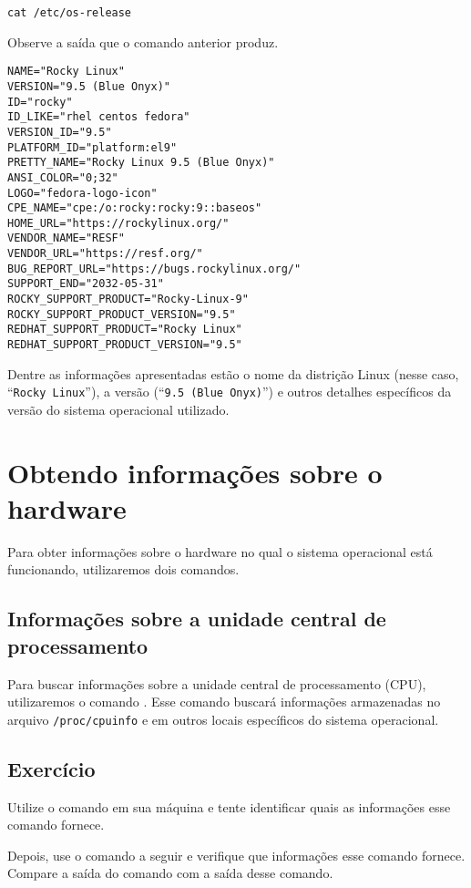 \begin{lstlisting}[style=MyBashStyle]
cat /etc/os-release 
\end{lstlisting}

Observe a saída que o comando anterior produz.
\begin{lstlisting}[style=outputStyle]
NAME="Rocky Linux"
VERSION="9.5 (Blue Onyx)"
ID="rocky"
ID_LIKE="rhel centos fedora"
VERSION_ID="9.5"
PLATFORM_ID="platform:el9"
PRETTY_NAME="Rocky Linux 9.5 (Blue Onyx)"
ANSI_COLOR="0;32"
LOGO="fedora-logo-icon"
CPE_NAME="cpe:/o:rocky:rocky:9::baseos"
HOME_URL="https://rockylinux.org/"
VENDOR_NAME="RESF"
VENDOR_URL="https://resf.org/"
BUG_REPORT_URL="https://bugs.rockylinux.org/"
SUPPORT_END="2032-05-31"
ROCKY_SUPPORT_PRODUCT="Rocky-Linux-9"
ROCKY_SUPPORT_PRODUCT_VERSION="9.5"
REDHAT_SUPPORT_PRODUCT="Rocky Linux"
REDHAT_SUPPORT_PRODUCT_VERSION="9.5"
\end{lstlisting}

Dentre as informações apresentadas estão o nome da distrição Linux (nesse caso, \enquote{\texttt{Rocky Linux}}), a versão (\enquote{\texttt{9.5 (Blue Onyx)}}) e outros detalhes específicos da versão do sistema operacional utilizado.

\section{Obtendo informações sobre o hardware}
Para obter informações sobre o hardware no qual o sistema operacional está funcionando, utilizaremos dois comandos. 

\subsection{Informações sobre a unidade central de processamento}
Para buscar informações sobre a unidade central de processamento (CPU), utilizaremos o comando  . Esse comando buscará informações armazenadas no arquivo \texttt{/proc/cpuinfo} e em outros locais específicos do sistema operacional.

\subsection{Exercício}
Utilize o comando  em sua máquina e tente identificar quais as informações esse comando fornece.

Depois, use o comando a seguir e verifique que informações esse comando fornece. Compare a saída do comando  com a saída desse comando.

